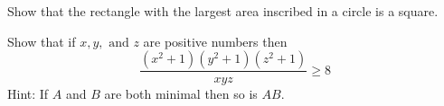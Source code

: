\documentclass[unboxed]{hwset}
\begin{document}
\begin{problem}[2.]
  Show that the rectangle with the largest area inscribed in a circle is a
  square.
\end{problem}

\begin{problem}[3.]
  Show that if $x,y,\text{ and } z$ are positive numbers then
  \begin{equation*}
    \dfrac{\left( x^2 + 1 \right)\left( y^2 + 1 \right)\left( z^2 + 1
    \right)}{xyz} \ge 8
  \end{equation*}
  Hint: If $A$ and $B$ are both minimal then so is $AB$.
\end{problem}
\end{document}

